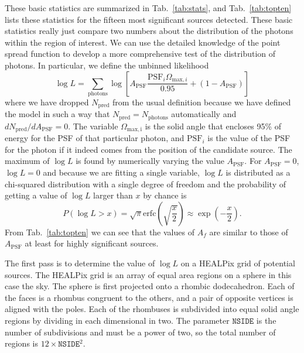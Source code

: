 \documentclass[useAMS,usenatbib]{mn2e}
\begin{document}
These basic statistics are summarized in Tab.~\ref{tab:stats}, and
Tab.~\ref{tab:topten} lists these statistics for the fifteen most
significant sources detected.  These basic statistics really just
compare two numbers about the distribution of the photons within the
region of interest.  We can use the detailed knowledge of the point
spread function to develop a more comprehensive test of the
distribution of photons.  In particular, we define the unbinned
likelihood \citep[this is very similar to the expression used by][for neutrino telescopes]{2008APh....29..299B}
\begin{equation}
  \log L = \sum_\mathrm{photons} \log \left [ A_\mathrm{PSF} \frac{\mathrm{PSF}_i \Omega_{\mathrm{max},i} }{0.95} + (1
    - A_\mathrm{PSF}) \right ]
  \label{eq:13}
\end{equation}
where we have dropped $N_\mathrm{pred}$ from the usual definition
because we have defined the model in such a way that
$N_\mathrm{pred}=N_\mathrm{photons}$ automatically and $d
N_\mathrm{pred}/dA_\mathrm{PSF}=0$.  The variable
$\Omega_\mathrm{max,i}$ is the solid angle that encloses 95\% of
energy for the PSF of that particular photon, and $\mathrm{PSF}_i$
is the value of the PSF for the photon if it indeed comes from the
position of the candidate source.  The maximum of $\log L$ is found
by numerically varying the value $A_\mathrm{PSF}$.  For
$A_\mathrm{PSF}=0$, $\log L=0$ and because we are fitting a single
variable, $\log L$ is distributed as a chi-squared distribution with
a single degree of freedom and the probability of getting a value of
$\log L$ larger than $x$ by chance is
\begin{equation}
  P(\log L > x) = \sqrt{\pi} \mathrm{erfc} \left ( \sqrt{\frac{x}{2}}
  \right ) \approx \exp \left (-\frac{x}{2} \right ).
  \label{eq:14}
\end{equation}
From Tab.~\ref{tab:topten} we can see that the values of $A_f$ are
similar to those of $A_\mathrm{PSF}$ at least for highly significant
sources.

The first pass is to determine the value of $\log L$ on a HEALPix grid
\citep{2005ApJ...622..759G} of potential sources.  The HEALPix grid is
an array of equal area regions on a sphere in this case the sky.  The
sphere is first projected onto a rhombic dodecahedron.  Each of the
faces is a rhombus congruent to the others, and a pair of opposite
vertices is aligned with the poles.  Each of the rhombuses is
subdivided into equal solid angle regions by dividing in each
dimensional in two.  The parameter $\mathtt{NSIDE}$ is the number of
subdivisions and must be a power of two, so the total number of
regions is $12 \times \mathtt{NSIDE}^2$.
\end{document}
